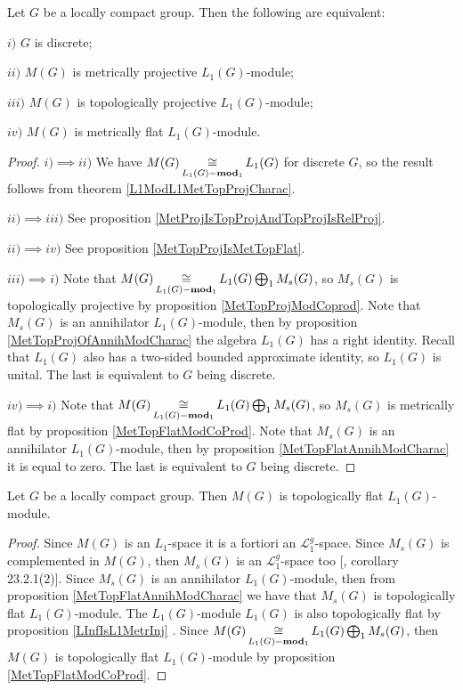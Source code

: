 \begin{proposition}\label{L1MetTopProjAndMetrFlatOfMeasAlg} Let $G$ be a locally compact group. Then the following are equivalent:

$i)$ $G$ is discrete;

$ii)$ $M(G)$ is metrically projective $L_1(G)$-module;

$iii)$ $M(G)$ is topologically projective $L_1(G)$-module;

$iv)$ $M(G)$ is metrically flat $L_1(G)$-module.
\end{proposition}
\begin{proof} 
$i)$$\implies$$ ii)$ We have $M(G)\mathop{\mathbin{\cong}}\limits_{L_1(G)-\mathbf{mod}_1}L_1(G)$ for discrete $G$, so the result follows from theorem \ref{L1ModL1MetTopProjCharac}. 

$ii)$$\implies$$ iii)$ See proposition \ref{MetProjIsTopProjAndTopProjIsRelProj}.

$ii)$$\implies$$ iv)$ See proposition \ref{MetTopProjIsMetTopFlat}.

$iii)$$\implies$$ i)$ Note that $M(G)\mathop{\mathbin{\cong}}\limits_{L_1(G)-\mathbf{mod}_1} L_1(G)\bigoplus_1 M_s(G)$, so $M_s(G)$ is topologically projective by proposition \ref{MetTopProjModCoprod}. Note that $M_s(G)$ is an annihilator $L_1(G)$-module, then by proposition \ref{MetTopProjOfAnnihModCharac} the algebra $L_1(G)$ has a right identity. Recall that $L_1(G)$ also has a two-sided bounded approximate identity, so $L_1(G)$ is unital. The last is equivalent to $G$ being discrete.

$iv)$$\implies$$ i)$ Note that $M(G)\mathop{\mathbin{\cong}}\limits_{L_1(G)-\mathbf{mod}_1} L_1(G)\bigoplus_1 M_s(G)$, so $M_s(G)$ is metrically flat by proposition \ref{MetTopFlatModCoProd}. Note that $M_s(G)$ is an annihilator $L_1(G)$-module, then by proposition \ref{MetTopFlatAnnihModCharac} it is equal to zero. The last is equivalent to $G$ being discrete.
\end{proof}

\begin{proposition}\label{MeasAlgIsL1TopFlat} Let $G$ be a locally compact group. Then $M(G)$ is topologically flat $L_1(G)$-module.
\end{proposition}
\begin{proof} Since $M(G)$ is an $L_1$-space it is a fortiori an $\mathscr{L}_1^g$-space. Since $M_s(G)$ is complemented in $M(G)$, then $M_s(G)$ is an $\mathscr{L}_1^g$-space too [\cite{DefFloTensNorOpId}, corollary 23.2.1(2)]. Since $M_s(G)$ is an annihilator $L_1(G)$-module, then from proposition \ref{MetTopFlatAnnihModCharac} we have that $M_s(G)$ is topologically flat $L_1(G)$-module. The $L_1(G)$-module $L_1(G)$ is also topologically flat by proposition \ref{LInfIsL1MetrInj} . Since $M(G)\mathop{\mathbin{\cong}}\limits_{L_1(G)-\mathbf{mod}_1}L_1(G)\bigoplus_1 M_s(G)$, then $M(G)$ is topologically flat $L_1(G)$-module by proposition \ref{MetTopFlatModCoProd}.
\end{proof}


